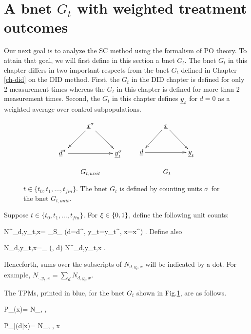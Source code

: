 \section{A bnet $G_t$ with weighted 
treatment outcomes}

Our next goal is to
analyze  the SC method using
the formalism of PO theory.
To attain that goal,  
we will first define
in this section a bnet
$G_t$. The bnet $G_t$ 
in this chapter differs
in two important respects from the bnet
$G_t$ defined in Chapter \ref{ch-did}
on the DID method.
First, the $G_t$ in the DID chapter
is defined for only 2 measurement times
whereas the $G_t$ in
this chapter is defined for
 more than 2  measurement times.
Second, the $G_t$ in this chapter 
defines ${\underline{y}}_t$ 
for $d=0$ as a weighted
average over control subpopulations.



\begin{figure}[h!]
$$
\begin{array}{ccc}
\xymatrix{
&\rvx^\s\ar[dl]\ar[dr]
\\
\rvd^\s\ar[rr]&
&\rvy_t^\s
}
&&
\xymatrix{
&\rvx\ar[dl]\ar[dr]
\\
\rvd\ar[rr]&
&\rvy_t
}
\\
\\
G_{t, unit}&&G_t
\end{array}
$$
\caption{$t\in \{t_0, t_1, \ldots, t_{fin}\}$.
The bnet $G_t$ is defined 
by counting units $\sigma$
for the bnet $G_{t, unit}$. 
} 
\label{fig-syn-con-G}
\end{figure}

 

Suppose $t\in \{t_0, t_1, \ldots, t_{fin}\}$.
For $\xi\in \{0,1\}$, define the 
following unit counts:


\beq
N^\xi_{d,y_t,x}=
\sum_{\s \in S_\xi}
\indi(d=d^\s, y_t=y_t^\xi,
 x=x^\s)
\;.
\eeq
Define also

\beq
N_{d,y_t,x}=\sum_{\xi\in\bool}
\indi(\xi, d) 
N^\xi_{d,y_t,x}
\;.
\eeq

Henceforth,
sums over the subscripts of 
$N_{d,y_t,x}$ will
be indicated by a dot.
For example,
$N_{\cdot,y_t,x}
=
\sum_d N_{d,y_t,x}
$.

The TPMs,
printed in blue,
for the 
bnet
$G_t$
shown
in Fig.\ref{fig-syn-con-G},
are as follows.


\beq\color{blue}
P_{\rvx}(x)=  
{N_{\cdot, \cdot, \cdot}}
\eeq
 
\beq\color{blue}
P_{\rvd|\rvx}(d|x)= 
{N_{\cdot, \cdot, x}}
\eeq

